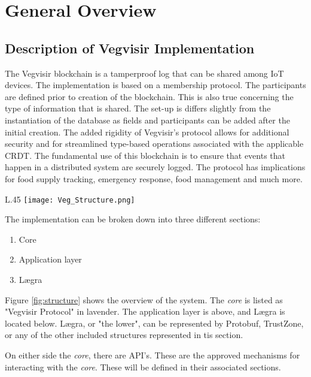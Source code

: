 \chapter{General Overview}

\section{Description of Vegvisir Implementation}

The Vegvisir blockchain is a tamperproof log that can be shared among IoT
devices. The implementation is based on a membership protocol. The participants
are defined prior to creation of the blockchain.  This is also true concerning
the type of information that is shared. The set-up is differs slightly from the
instantiation of the database as fields and participants can be added after the
initial creation. The added rigidity of Vegvisir's protocol allows for
additional security and for streamlined type-based operations associated with
the applicable CRDT. The fundamental use of this blockchain is to ensure that
events that happen in a distributed system are securely logged. The protocol
has implications for food supply tracking, emergency response, food management
and much more.

\begin{wrapfigure}{L}{.45\textwidth}
    \centering
    \texttt{[image: Veg\_Structure.png]}
    \caption{Vegvisir Structure}
    \label{fig:structure}
\end{wrapfigure}

The implementation can be broken down into three different sections:
\begin{enumerate}
    \item{ Core }
    \item{ Application layer }
    \item{ Lægra }
\end{enumerate}
Figure \ref{fig:structure} shows the overview of the system. The \emph{core} is
listed as "Vegvisir Protocol" in lavender. The application layer is above, and
Lægra is located below. Lægra, or "the lower", can be represented by Protobuf,
TrustZone, or any of the other included structures represented in tis section.

On either side the \emph{core}, there are API's. These are the approved
mechanisms for interacting with the \emph{core}. These will be defined in their
associated sections.
